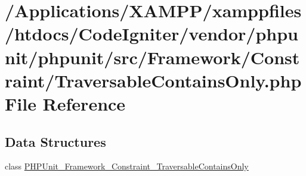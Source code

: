 \hypertarget{_traversable_contains_only_8php}{}\section{/\+Applications/\+X\+A\+M\+P\+P/xamppfiles/htdocs/\+Code\+Igniter/vendor/phpunit/phpunit/src/\+Framework/\+Constraint/\+Traversable\+Contains\+Only.php File Reference}
\label{_traversable_contains_only_8php}
\subsection*{Data Structures}
\begin{DoxyCompactItemize}
\item 
class \mbox{\hyperlink{class_p_h_p_unit___framework___constraint___traversable_contains_only}{P\+H\+P\+Unit\+\_\+\+Framework\+\_\+\+Constraint\+\_\+\+Traversable\+Contains\+Only}}
\end{DoxyCompactItemize}

